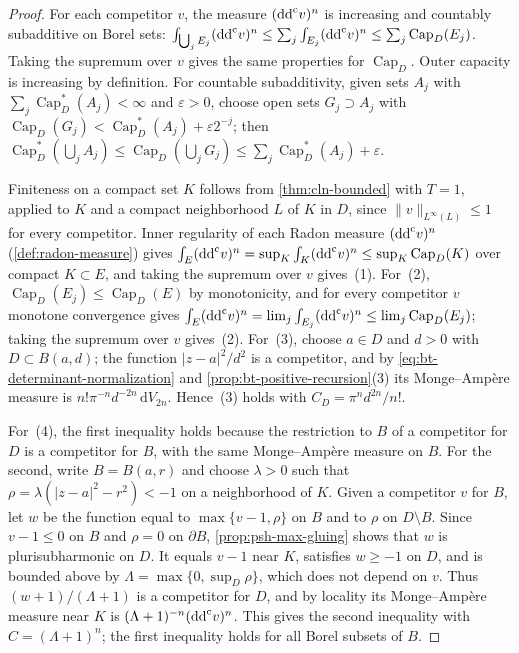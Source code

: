 \begin{proof}
For each competitor $v$, the measure $(\mathrm{dd}^{\mathrm{c}} v)^n$ is increasing and countably subadditive on Borel sets: $\int_{\bigcup_jE_j}(\mathrm{dd}^{\mathrm{c}} v)^n\le\sum_j\int_{E_j}(\mathrm{dd}^{\mathrm{c}} v)^n\le\sum_j\operatorname{Cap}_D(E_j)$. Taking the supremum over $v$ gives the same properties for $\operatorname{Cap}_D$. Outer capacity is increasing by definition. For countable subadditivity, given sets $A_j$ with $\sum_j\operatorname{Cap}^*_D(A_j)<\infty$ and $\varepsilon>0$, choose open sets $G_j\supset A_j$ with $\operatorname{Cap}_D(G_j)<\operatorname{Cap}^*_D(A_j)+\varepsilon2^{-j}$; then $\operatorname{Cap}^*_D(\bigcup_jA_j)\le\operatorname{Cap}_D(\bigcup_jG_j)\le\sum_j\operatorname{Cap}^*_D(A_j)+\varepsilon$.

Finiteness on a compact set $K$ follows from \cref{thm:cln-bounded} with $T=1$, applied to $K$ and a compact neighborhood $L$ of $K$ in $D$, since $\|v\|_{L^\infty(L)}\le1$ for every competitor. Inner regularity of each Radon measure $(\mathrm{dd}^{\mathrm{c}} v)^n$ (\cref{def:radon-measure}) gives $\int_E(\mathrm{dd}^{\mathrm{c}} v)^n=\sup_K\int_K(\mathrm{dd}^{\mathrm{c}} v)^n\le\sup_K\operatorname{Cap}_D(K)$ over compact $K\subset E$, and taking the supremum over $v$ gives~(1). For~(2), $\operatorname{Cap}_D(E_j)\le\operatorname{Cap}_D(E)$ by monotonicity, and for every competitor $v$ monotone convergence gives $\int_E(\mathrm{dd}^{\mathrm{c}} v)^n=\lim_j\int_{E_j}(\mathrm{dd}^{\mathrm{c}} v)^n\le\lim_j\operatorname{Cap}_D(E_j)$; taking the supremum over $v$ gives~(2). For~(3), choose $a\in D$ and $d>0$ with $D\subset B(a,d)$; the function $|z-a|^2/d^2$ is a competitor, and by \eqref{eq:bt-determinant-normalization} and \cref{prop:bt-positive-recursion}(3) its Monge--Amp\`ere measure is $n!\pi^{-n}d^{-2n}\,\mathrm dV_{2n}$. Hence~(3) holds with $C_D=\pi^nd^{2n}/n!$.

For~(4), the first inequality holds because the restriction to $B$ of a competitor for $D$ is a competitor for $B$, with the same Monge--Amp\`ere measure on $B$. For the second, write $B=B(a,r)$ and choose $\lambda>0$ such that $\rho=\lambda(|z-a|^2-r^2)<-1$ on a neighborhood of $K$. Given a competitor $v$ for $B$, let $w$ be the function equal to $\max\{v-1,\rho\}$ on $B$ and to $\rho$ on $D\setminus B$. Since $v-1\le0$ on $B$ and $\rho=0$ on $\partial B$, \cref{prop:psh-max-gluing} shows that $w$ is plurisubharmonic on $D$. It equals $v-1$ near $K$, satisfies $w\ge-1$ on $D$, and is bounded above by $\Lambda=\max\{0,\sup_D\rho\}$, which does not depend on $v$. Thus $(w+1)/(\Lambda+1)$ is a competitor for $D$, and by locality its Monge--Amp\`ere measure near $K$ is $(\Lambda+1)^{-n}(\mathrm{dd}^{\mathrm{c}} v)^n$. This gives the second inequality with $C=(\Lambda+1)^n$; the first inequality holds for all Borel subsets of $B$.


\end{proof}
